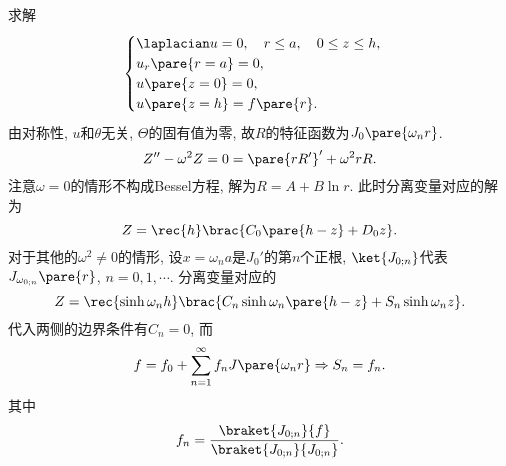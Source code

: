 \documentclass[hidelinks]{ctexart}
\begin{document}
\begin{sample}
    \begin{ex}
        求解
        \[ \begin{cases}
            \laplacian u = 0,\quad r\le a,\quad 0\le z\le h, \\
            u_r\pare{r=a} = 0, \\
            u\pare{z=0} = 0, \\
            u\pare{z=h} = f\pare{r}.
        \end{cases} \]
        由对称性, $u$和$\theta$无关, $\Theta$的固有值为零, 故$R$的特征函数为$J_0\pare{\omega_n r}$.
        \[ Z'' - \omega^2 Z = 0 = \pare{rR'}' + \omega^2 rR. \]
        注意$\omega = 0$的情形不构成Bessel方程, 解为$R = A+B\ln r$. 此时分离变量对应的解为
        \[ Z = \rec{h}\brac{C_0 \pare{h-z} + D_0 z}. \]
        对于其他的$\omega^2\neq 0$的情形, 设$x=\omega_n a$是$J_0'$的第$n$个正根, $\ket{J_{0;n}}$代表$J_{\omega_{0;n}}\pare{r}$, $n=0,1,\cdots$. 分离变量对应的
        \[ Z= \rec{\sinh \omega_n h}\brac{C_n \sinh \omega_n \pare{h-z} + S_n \sinh \omega_n z}. \]
        代入两侧的边界条件有$C_n = 0$, 而
        \[ f = f_0 + \sum_{n=1}^\infty f_nJ\pare{\omega_n r} \Rightarrow S_n = f_n. \]
        其中
        \[ f_n = \frac{\braket{J_{0;n}}{f}}{\braket{J_{0;n}}{J_{0;n}}}. \]
    \end{ex}
\end{sample}
\end{document}
